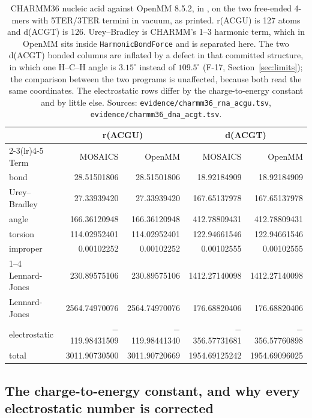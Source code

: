 \begin{table}[t]
\centering
\small
\caption{CHARMM36 nucleic acid against OpenMM 8.5.2, in \kcal{}, on the two
free-ended 4-mers with 5TER/3TER termini in vacuum, as printed. r(ACGU) is 127
atoms and d(ACGT) is 126. Urey--Bradley is CHARMM's 1--3 harmonic term, which in
OpenMM sits inside \texttt{HarmonicBondForce} and is separated here. The two
d(ACGT) bonded columns are inflated by a defect in that committed structure, in
which one H--C--H angle is $3.15^{\circ}$ instead of $109.5^{\circ}$ (F-17,
Section~\ref{sec:limits}); the comparison between the two programs is
unaffected, because both read the same coordinates. The electrostatic rows
differ by the charge-to-energy constant and by little else. Sources:
\texttt{evidence/charmm36\_rna\_acgu.tsv}, \texttt{evidence/charmm36\_dna\_acgt.tsv}.}
\label{tab:charmm36}
\begin{tabular}{@{}lrrrr@{}}
\toprule
& \multicolumn{2}{c}{r(ACGU)} & \multicolumn{2}{c}{d(ACGT)} \\
\cmidrule(lr){2-3}\cmidrule(lr){4-5}
Term & MOSAICS & OpenMM & MOSAICS & OpenMM \\
\midrule
bond           &   28.51501806 &   28.51501806 &   18.92184909 &   18.92184909 \\
Urey--Bradley  &   27.33939420 &   27.33939420 &  167.65137978 &  167.65137978 \\
angle          &  166.36120948 &  166.36120948 &  412.78809431 &  412.78809431 \\
torsion        &  114.02952401 &  114.02952401 &  122.94661546 &  122.94661546 \\
improper       &    0.00102252 &    0.00102252 &    0.00102555 &    0.00102555 \\
1--4 Lennard-Jones & 230.89575106 & 230.89575106 & 1412.27140098 & 1412.27140098 \\
Lennard-Jones  & 2564.74970076 & 2564.74970076 &  176.68820406 &  176.68820406 \\
electrostatic  & $-$119.98431509 & $-$119.98441340 & $-$356.57731681 & $-$356.57760898 \\
\midrule
total          & 3011.90730500 & 3011.90720669 & 1954.69125242 & 1954.69096025 \\
\bottomrule
\end{tabular}
\end{table}

\subsection{The charge-to-energy constant, and why every electrostatic number is corrected}
\label{sec:constant}

